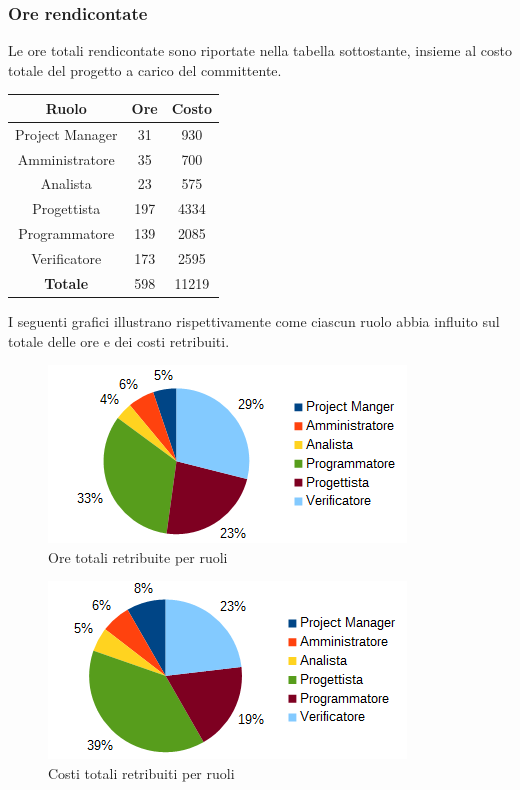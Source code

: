 		\subsubsection{Ore rendicontate}
		Le ore totali rendicontate sono riportate nella tabella sottostante, insieme al costo totale del progetto a carico del committente. \\
		\begin{table}[H]
		\centering
		\begin{tabular}{|c|c|c|}
			\hline
			\textbf{Ruolo}		& \textbf{Ore}	& \textbf{Costo} \\
			\hline
			Project Manager		& 31			& 930	\\
			Amministratore		& 35			& 700	\\
			Analista			& 23			& 575	\\
			Progettista			& 197			& 4334	\\
			Programmatore		& 139			& 2085	\\
			Verificatore		& 173			& 2595	\\
			\hline
			\textbf{Totale}		& 598			& 11219	\\
			\hline
		\end{tabular}
		\end{table}
		I seguenti grafici illustrano rispettivamente come ciascun ruolo abbia influito sul totale delle ore e dei costi retribuiti. \\
		\begin{figure}[H]
		\centering
			\includegraphics[width=1\linewidth]{immagini/grafici/orario_rendicontato-torta.png}
			\caption{Ore totali retribuite per ruoli}
		\end{figure}
		\begin{figure}[H]
			\centering
			\includegraphics[width=1\linewidth]{immagini/grafici/orario_rendicontato-torta-costo.png}
			\caption{Costi totali retribuiti per ruoli}
		\end{figure}

